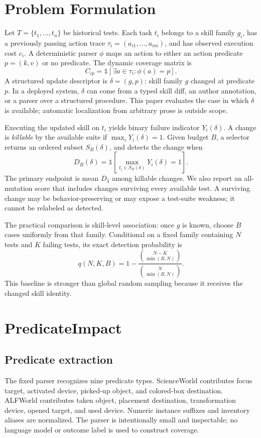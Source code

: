 \documentclass[10pt]{article}
\begin{document}
\section{Problem Formulation}
Let $T=\{t_1,\ldots,t_n\}$ be historical tests. Each task $t_i$ belongs to a skill family $g_i$, has a previously passing action trace $\tau_i=(a_{i1},\ldots,a_{im})$, and has observed execution cost $c_i$. A deterministic parser $\phi$ maps an action to either an action predicate $p=(k,v)$ or no predicate. The dynamic coverage matrix is
\begin{equation}
 C_{ip}=\mathbb{1}\left[\exists a\in\tau_i:\phi(a)=p\right].
\end{equation}
A structured update descriptor is $\delta=(g,p)$: skill family $g$ changed at predicate $p$. In a deployed system, $\delta$ can come from a typed skill diff, an author annotation, or a parser over a structured procedure. This paper evaluates the case in which $\delta$ is available; automatic localization from arbitrary prose is outside scope.

Executing the updated skill on $t_i$ yields binary failure indicator $Y_i(\delta)$. A change is \emph{killable} by the available suite if $\max_i Y_i(\delta)=1$. Given budget $B$, a selector returns an ordered subset $S_B(\delta)$, and detects the change when
\begin{equation}
 D_B(\delta)=\mathbb{1}\left[\max_{t_i\in S_B(\delta)}Y_i(\delta)=1\right].
\end{equation}
The primary endpoint is mean $D_3$ among killable changes. We also report an all-mutation score that includes changes surviving every available test. A surviving change may be behavior-preserving or may expose a test-suite weakness; it cannot be relabeled as detected.

The practical comparison is skill-level association: once $g$ is known, choose $B$ cases uniformly from that family. Conditional on a fixed family containing $N$ tests and $K$ failing tests, its exact detection probability is
\begin{equation}
 q(N,K,B)=1-\frac{\binom{N-K}{\min(B,N)}}{\binom{N}{\min(B,N)}}.
\end{equation}
This baseline is stronger than global random sampling because it receives the changed skill identity.

\section{PredicateImpact}
\subsection{Predicate extraction}
The fixed parser recognizes nine predicate types. ScienceWorld contributes focus target, activated device, picked-up object, and colored-box destination. ALFWorld contributes taken object, placement destination, transformation device, opened target, and used device. Numeric instance suffixes and inventory aliases are normalized. The parser is intentionally small and inspectable; no language model or outcome label is used to construct coverage.
\end{document}
